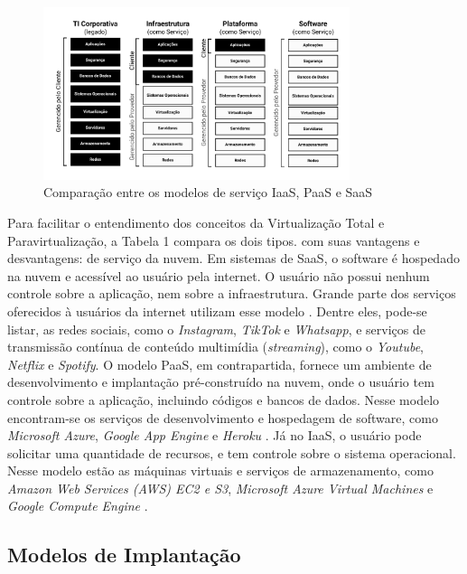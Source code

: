 \begin{figure}[htb]
\centering
\includegraphics[width=0.8\textwidth]{figuras/Figura 1 - Comparação entre os modelos de serviço.png}
\caption{Comparação entre os modelos de serviço IaaS, PaaS e SaaS}
\label{fig:modelos-servico}
\end{figure}

Para facilitar o entendimento dos conceitos da Virtualização Total e Paravirtualização, a Tabela 1 compara os dois tipos. com suas vantagens e desvantagens: de serviço
 da nuvem. Em sistemas de SaaS, o software é hospedado na nuvem e acessível ao usuário pela internet. O usuário não possui nenhum controle sobre a aplicação, nem sobre a infraestrutura. Grande parte dos serviços oferecidos à usuários da internet utilizam esse modelo \cite{rizvi2024}. Dentre eles, pode-se listar, as redes sociais, como o \textit{Instagram}, \textit{TikTok} e \textit{Whatsapp}, e serviços de transmissão contínua de conteúdo multimídia (\textit{streaming}), como o \textit{Youtube}, \textit{Netflix} e \textit{Spotify}. O modelo PaaS, em contrapartida, fornece um ambiente de desenvolvimento e implantação pré-construído na nuvem, onde o usuário tem controle sobre a aplicação, incluindo códigos e bancos de dados. Nesse modelo encontram-se os serviços de desenvolvimento e hospedagem de software, como \textit{Microsoft Azure}, \textit{Google App Engine} e \textit{Heroku} \cite{rizvi2024}. Já no IaaS, o usuário pode solicitar uma quantidade de recursos, e tem controle sobre o sistema operacional. Nesse modelo estão as máquinas virtuais e serviços de armazenamento, como  \textit{Amazon Web Services (AWS) EC2 e S3},  \textit{Microsoft Azure Virtual Machines} e  \textit{Google Compute Engine}  \cite{rizvi2024}.

\subsection{Modelos de Implantação}

